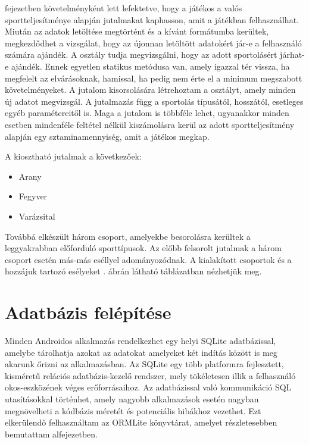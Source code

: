  fejezetben követelményként lett lefektetve, hogy a játékos a valós sportteljesítménye alapján jutalmakat kaphasson, amit a játékban felhasználhat. 
Miután az adatok letöltése megtörtént és a kívánt formátumba kerültek, megkezdődhet a vizsgálat, hogy az újonnan letöltött adatokért jár-e a felhasználó számára ajándék. 
A  osztály tudja megvizsgálni, hogy az adott sportolásért járhat-e ajándék. 
Ennek egyetlen statikus metódusa van, amely igazzal tér vissza, ha megfelelt az elvárásoknak, hamissal, ha pedig nem érte el a minimum megszabott követelményeket. 
A jutalom kisorsolására létrehoztam a  osztályt, amely minden új adatot megvizsgál. 
A jutalmazás függ a sportolás típusától, hosszától, esetleges egyéb paramétereitől is. 
Maga a jutalom is többféle lehet, ugyanakkor minden esetben mindenféle feltétel nélkül kiszámolásra kerül az adott sportteljesítmény alapján egy sztaminamennyiség, amit a játékos megkap. 

A kiosztható jutalmak a következőek:

\begin{itemize}
	\item Arany
	\item Fegyver 
	\item Varázsital 
\end{itemize}

Továbbá elkészült három csoport, amelyekbe besorolásra kerültek a leggyakrabban előforduló sporttípusok. 
Az előbb felsorolt jutalmak a három csoport esetén más-más eséllyel adományozódnak. 
A kialakított csoportok és a hozzájuk tartozó esélyeket . ábrán látható táblázatban nézhetjük meg. 


\section{Adatbázis felépítése}
\label{database}

Minden Androidos alkalmazás rendelkezhet egy helyi SQLite adatbázissal, amelybe tárolhatja azokat az adatokat amelyeket két indítás között is meg akarunk őrizni az alkalmazásban. 
Az SQLite egy több platformra fejlesztett, kisméretű relációs adatbázis-kezelő rendszer, mely tökéletesen illik a felhasználó okos-eszközének véges erőforrásaihoz. 
Az adatbázissal való kommunikáció SQL utasításokkal történhet, amely nagyobb alkalmazások esetén nagyban megnövelheti a kódbázis méretét és potenciális hibákhoz vezethet. 
Ezt elkerülendő felhasználtam az ORMLite könyvtárat, amelyet részletesebben bemutattam  alfejezetben. 

